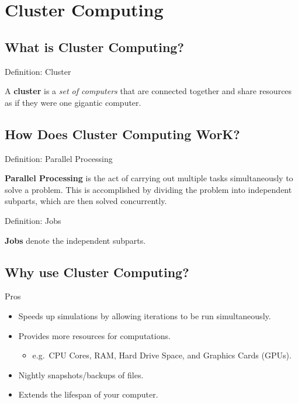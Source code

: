 \documentclass[
  letterpaper,
  DIV=11,
  numbers=noendperiod]{scrreport}
\providecommand{\tightlist}{%
  \setlength{\itemsep}{0pt}\setlength{\parskip}{0pt}}\usepackage{longtable,booktabs,array}
\begin{document}
\hypertarget{cluster-computing}{%
\chapter{Cluster Computing}\label{cluster-computing}}

\hypertarget{what-is-cluster-computing}{%
\section{What is Cluster Computing?}\label{what-is-cluster-computing}}

Definition: Cluster

A \textbf{cluster} is a \emph{set of computers} that are connected
together and share resources as if they were one gigantic computer.

\hypertarget{how-does-cluster-computing-work}{%
\section{How Does Cluster Computing
WorK?}\label{how-does-cluster-computing-work}}

Definition: Parallel Processing

\textbf{Parallel Processing} is the act of carrying out multiple tasks
simultaneously to solve a problem. This is accomplished by dividing the
problem into independent subparts, which are then solved concurrently.

Definition: Jobs

\textbf{Jobs} denote the independent subparts.

\hypertarget{why-use-cluster-computing}{%
\section{Why use Cluster Computing?}\label{why-use-cluster-computing}}

Pros

\begin{itemize}
\tightlist
\item
  Speeds up simulations by allowing iterations to be run simultaneously.
\item
  Provides more resources for computations.

  \begin{itemize}
  \tightlist
  \item
    e.g.~CPU Cores, RAM, Hard Drive Space, and Graphics Cards (GPUs).
  \end{itemize}
\item
  Nightly snapshots/backups of files.
\item
  Extends the lifespan of your computer.
\end{itemize}
\end{document}
